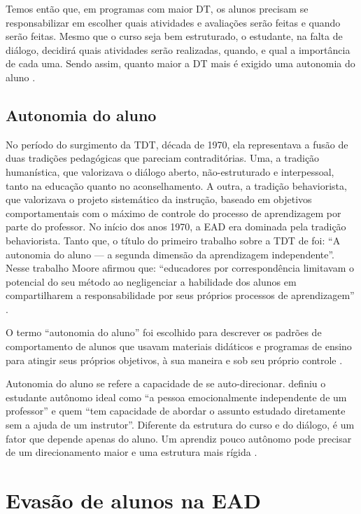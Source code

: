 Temos então que, em programas com maior DT, os alunos precisam se
responsabilizar em escolher quais atividades e avaliações serão feitas e quando
serão feitas. Mesmo que o curso seja bem estruturado, o estudante, na falta de
diálogo, decidirá quais atividades serão realizadas, quando, e qual a
importância de cada uma. Sendo assim, quanto maior a DT mais é exigido uma
autonomia do aluno \cite{moore2008teoria}.

\subsection{Autonomia do aluno}

No período do surgimento da TDT, década de 1970, ela representava a fusão de
duas tradições pedagógicas que pareciam contraditórias. Uma, a tradição
humanística, que valorizava o diálogo aberto, não-estruturado e interpessoal,
tanto na educação quanto no aconselhamento. A outra, a tradição behaviorista,
que valorizava o projeto sistemático da instrução, baseado em objetivos
comportamentais com o máximo de controle do processo de aprendizagem por parte
do professor. No início dos anos 1970, a EAD era dominada pela tradição
behaviorista. Tanto que, o título do primeiro trabalho sobre a TDT de
 foi: ``A autonomia do aluno --- a segunda dimensão
da aprendizagem independente''. Nesse trabalho Moore afirmou que: ``educadores
por correspondência limitavam o potencial do seu método ao negligenciar a
habilidade dos alunos em compartilharem a responsabilidade por seus próprios
processos de aprendizagem'' \cite{moore2008teoria}.

O termo ``autonomia do aluno'' foi escolhido para descrever os padrões de
comportamento de alunos que usavam materiais didáticos e programas de ensino
para atingir seus próprios objetivos, à sua maneira e sob seu próprio controle
\cite{moore2008teoria}.

Autonomia do aluno  se refere a capacidade de se auto-direcionar.
 definiu o estudante autônomo ideal como ``a
pessoa emocionalmente independente de um professor'' e quem ``tem capacidade de
abordar o assunto estudado diretamente sem a ajuda de um instrutor''. Diferente
da estrutura do curso e do diálogo, é um fator que depende apenas do aluno. Um
aprendiz pouco autônomo pode precisar de um direcionamento maior e uma estrutura
mais rígida \cite{huang2016understanding}.

\section{Evasão de alunos na EAD}

